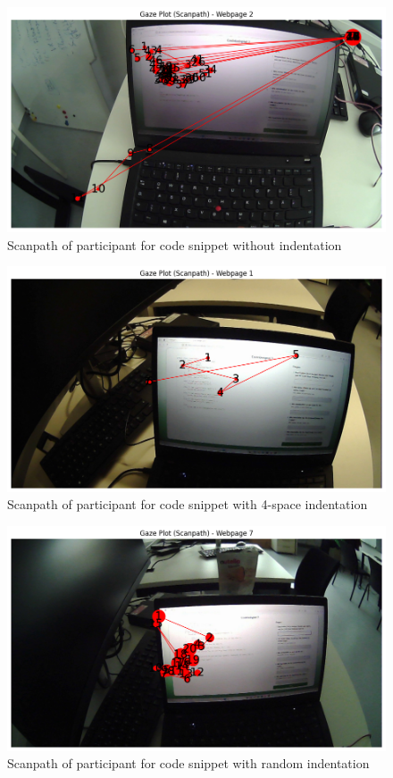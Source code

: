 \begin{figure} [H]
  \centering
  \includegraphics[scale=0.6]{figures/0-ind-rechner.png}
  \caption{Scanpath of participant for code snippet without indentation }
  \label{fig:AnhangsChor}
\end{figure}
 

\begin{figure} [H]
  \centering
  \includegraphics[scale=0.6]{figures/4-ind.png}
  \caption{Scanpath of participant for code snippet with 4-space indentation}
  \label{fig:AnhangsChor}
\end{figure}


\begin{figure} [H]
  \centering
  \includegraphics[scale=0.6]{figures/r-ind.png}
  \caption{Scanpath of  participant for code snippet with random indentation}
  \label{fig:AnhangsChor}
\end{figure}



